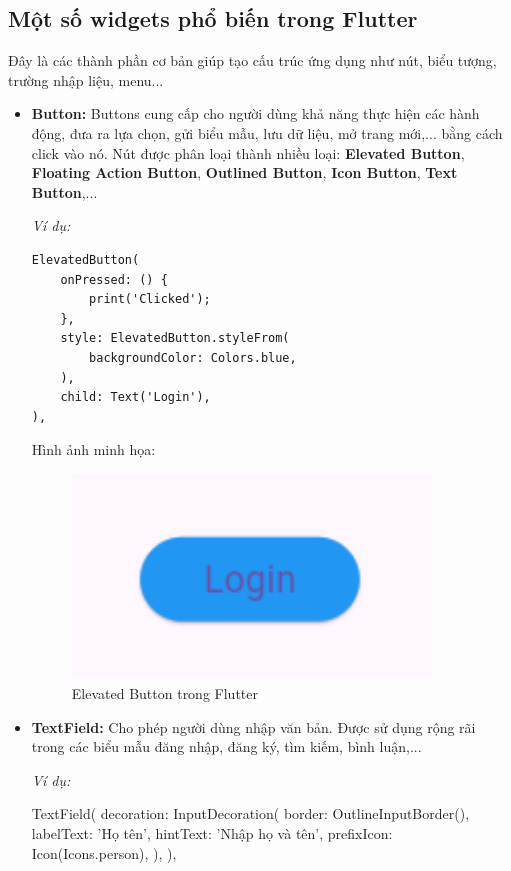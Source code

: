 \documentclass[../DoAn.tex]{subfiles}
\numberwithin{figure}{chapter}
\begin{document}
\subsection{Một số widgets phổ biến trong Flutter}
Đây là các thành phần cơ bản giúp tạo cấu trúc ứng dụng như nút, biểu tượng, trường nhập liệu, menu...
\begin{itemize}
\item \textbf{Button: } Buttons cung cấp cho người dùng khả năng thực hiện các hành động, đưa ra lựa chọn, gửi biểu mẫu, lưu dữ liệu, mở trang mới,... bằng cách click vào nó. Nút được phân loại thành nhiều loại: \textbf{Elevated Button}, \textbf{Floating Action Button}, \textbf{Outlined Button}, \textbf{Icon Button}, \textbf{Text Button},...

\textit{Ví dụ:}
\begin{lstlisting}
ElevatedButton(
    onPressed: () {
        print('Clicked'); 
    },
    style: ElevatedButton.styleFrom(
        backgroundColor: Colors.blue, 
    ),
    child: Text('Login'),
),
\end{lstlisting}

Hình ảnh minh họa:
\begin{figure}[H]
    \centering
    \includegraphics[width=0.9\textwidth]{Hinhve/Chuong5/buttonWidget.png}
    \caption{Elevated Button trong Flutter}
    \label{fig:buttonwidget}
\end{figure}
\item \textbf{TextField:} Cho phép người dùng nhập văn bản. Được sử dụng rộng rãi trong các biểu mẫu đăng nhập, đăng ký, tìm kiếm, bình luận,...

\textit{Ví dụ:}
\begin{myverbatim}
TextField(
  decoration: InputDecoration(
    border: OutlineInputBorder(),
    labelText: 'Họ tên',
    hintText: 'Nhập họ và tên',
    prefixIcon: Icon(Icons.person),
  ),
),
\end{myverbatim}


\end{itemize}
\end{document}
